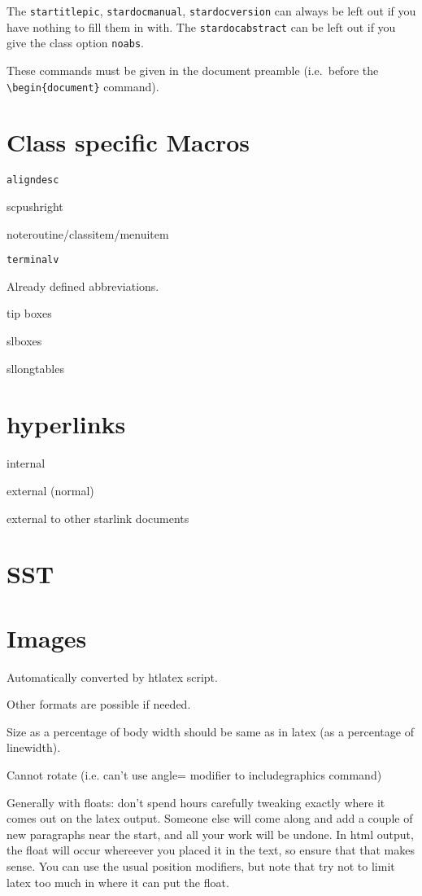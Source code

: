 \documentclass[twoside,11pt,nolof]{starlink}
\begin{document}
The \texttt{startitlepic}, \texttt{stardocmanual},
\texttt{stardocversion} can always be left out if you have nothing to
fill them in with. The \texttt{stardocabstract} can be left out if you
give the class option \texttt{noabs}.

These commands must be given in the document preamble (i.e.\ before
the \verb+\begin{document}+ command).

\section{Class specific Macros}

\texttt{aligndesc}


scpushright

noteroutine/classitem/menuitem

\texttt{terminalv}


Already defined abbreviations.

tip boxes

slboxes

sllongtables

\section{hyperlinks}

internal

external (normal)

external to other starlink documents

\section{SST}


\section{Images}
Automatically converted by htlatex script.

Other formats are possible if needed.

Size as a percentage of body width should be same as in latex (as a
percentage of linewidth).

Cannot rotate (i.e. can't use angle= modifier to includegraphics
command)

Generally with floats: don't spend hours carefully tweaking exactly
where it comes out on the latex output. Someone else will come along
and add a couple of new paragraphs near the start, and all your work
will be undone. In html output, the float will occur whereever you
placed it in the text, so ensure that that makes sense. You can use
the usual position modifiers, but note that try not to limit latex too
much in where it can put the float.
\end{document}
